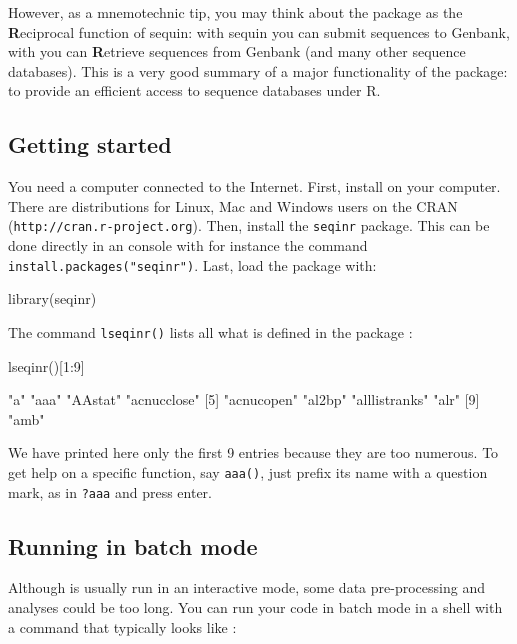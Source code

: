 \documentclass{article}
\begin{document}
However, as a mnemotechnic tip, you may think about the \seqinr{} package
as the {\bf{R}}eciprocal function of sequin: with sequin you can submit sequences
to Genbank, with \seqinr{} you can {\bf{R}}etrieve sequences from Genbank
(and many other sequence databases). This is
a very good summary of a major functionality of the \seqinr{} package: to
provide an efficient access to sequence databases under R.

\subsection{Getting started}

You need a computer connected to the Internet. First, install \Rlogo{} on your computer.
There are distributions for Linux, Mac and Windows users
on the CRAN (\texttt{http://cran.r-project.org}). Then, install the \texttt{seqinr} package. This can be done directly in an \Rlogo{} console
with for instance the command \texttt{install.packages("seqinr")}. 
Last, load the \seqinr{} package with:

\begin{Schunk}
\begin{Sinput}
library(seqinr)
\end{Sinput}
\end{Schunk}

The command \texttt{lseqinr()} lists all what is defined in the package \seqinr{}:

\begin{Schunk}
\begin{Sinput}
 lseqinr()[1:9]
\end{Sinput}
\begin{Soutput}
[1] "a"            "aaa"          "AAstat"       "acnucclose"  
[5] "acnucopen"    "al2bp"        "alllistranks" "alr"         
[9] "amb"         
\end{Soutput}
\end{Schunk}

We have printed here only the first 9 entries because they are too numerous.
To get help on a specific function, say \texttt{aaa()}, just prefix its name
with a question mark, as in \texttt{?aaa} and press enter.

\subsection{Running \Rlogo{} in batch mode}

Although \Rlogo{} is usually run in an interactive mode, some data pre-processing 
and analyses could be too long. You can run your \Rlogo{} code in batch mode
in a shell with a command that typically looks like :
\end{document}
